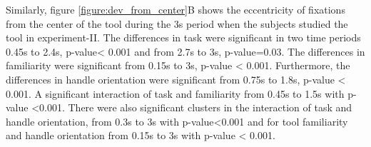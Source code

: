 Similarly, figure \ref{figure:dev_from_center}B shows the eccentricity of fixations from the center of the tool during the 3s period when the subjects studied the tool in experiment-II. The differences in task were significant in two time periods 0.45s to 2.4s, p-value< 0.001 and from 2.7s to 3s, p-value=0.03. The differences in familiarity were significant from 0.15s to 3s, p-value < 0.001. Furthermore, the differences in handle orientation were significant from 0.75s to 1.8s, p-value < 0.001. A significant interaction of task and familiarity from 0.45s to 1.5s with p-value <0.001. There were also significant clusters in the interaction of task and handle orientation, from 0.3s to 3s with p-value<0.001 and for tool familiarity and handle orientation from 0.15s to 3s with p-value < 0.001.



